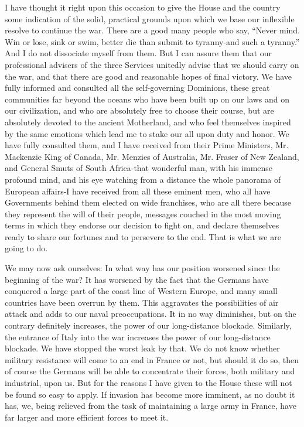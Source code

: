 \documentclass[a4paper]{amsbook}
\begin{document}
I have thought it right upon this occasion to give the House and the country some indication of the solid, practical grounds upon which we base our inflexible resolve to continue the war. There are a good many people who say, “Never mind. Win or lose, sink or swim, better die than submit to tyranny-and such a tyranny.” And I do not dissociate myself from them. But I can assure them that our professional advisers of the three Services unitedly advise that we should carry on the war, and that there are good and reasonable hopes of final victory. We have fully informed and consulted all the self-governing Dominions, these great communities far beyond the oceans who have been built up on our laws and on our civilization, and who are absolutely free to choose their course, but are absolutely devoted to the ancient Motherland, and who feel themselves inspired by the same emotions which lead me to stake our all upon duty and honor. We have fully consulted them, and I have received from their Prime Ministers, Mr. Mackenzie King of Canada, Mr. Menzies of Australia, Mr. Fraser of New Zealand, and General Smuts of South Africa-that wonderful man, with his immense profound mind, and his eye watching from a distance the whole panorama of European affairs-I have received from all these eminent men, who all have Governments behind them elected on wide franchises, who are all there because they represent the will of their people, messages couched in the most moving terms in which they endorse our decision to fight on, and declare themselves ready to share our fortunes and to persevere to the end. That is what we are going to do.

We may now ask ourselves: In what way has our position worsened since the beginning of the war? It has worsened by the fact that the Germans have conquered a large part of the coast line of Western Europe, and many small countries have been overrun by them. This aggravates the possibilities of air attack and adds to our naval preoccupations. It in no way diminishes, but on the contrary definitely increases, the power of our long-distance blockade. Similarly, the entrance of Italy into the war increases the power of our long-distance blockade. We have stopped the worst leak by that. We do not know whether military resistance will come to an end in France or not, but should it do so, then of course the Germans will be able to concentrate their forces, both military and industrial, upon us. But for the reasons I have given to the House these will not be found so easy to apply. If invasion has become more imminent, as no doubt it has, we, being relieved from the task of maintaining a large army in France, have far larger and more efficient forces to meet it.
\end{document}

